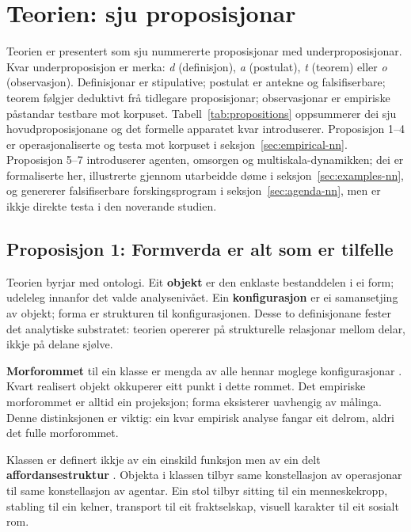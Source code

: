 \section{Teorien: sju proposisjonar}
\label{sec:theory-nn}

Teorien er presentert som sju nummererte proposisjonar med underproposisjonar. Kvar underproposisjon er merka: \textit{d} (definisjon), \textit{a} (postulat), \textit{t} (teorem) eller \textit{o} (observasjon). Definisjonar er stipulative; postulat er antekne og falsifiserbare; teorem følgjer deduktivt frå tidlegare proposisjonar; observasjonar er empiriske påstandar testbare mot korpuset. Tabell~\ref{tab:propositions} oppsummerer dei sju hovudproposisjonane og det formelle apparatet kvar introduserer. Proposisjon 1--4 er operasjonaliserte og testa mot korpuset i seksjon~\ref{sec:empirical-nn}. Proposisjon 5--7 introduserer agenten, omsorgen og multiskala-dynamikken; dei er formaliserte her, illustrerte gjennom utarbeidde døme i seksjon~\ref{sec:examples-nn}, og genererer falsifiserbare forskingsprogram i seksjon~\ref{sec:agenda-nn}, men er ikkje direkte testa i den noverande studien.

\subsection{Proposisjon 1: Formverda er alt som er tilfelle}

Teorien byrjar med ontologi. Eit \textbf{objekt} er den enklaste bestanddelen i ei form; udeleleg innanfor det valde analysenivået. Ein \textbf{konfigurasjon} er ei samansetjing av objekt; forma er strukturen til konfigurasjonen. Desse to definisjonane fester det analytiske substratet: teorien opererer på strukturelle relasjonar mellom delar, ikkje på delane sjølve.

\textbf{Morforommet} til ein klasse er mengda av alle hennar moglege konfigurasjonar \parencite{Raup1966, Mitteroecker2009}. Kvart realisert objekt okkuperer eitt punkt i dette rommet. Det empiriske morforommet er alltid ein projeksjon; forma eksisterer uavhengig av målinga. Denne distinksjonen er viktig: ein kvar empirisk analyse fangar eit delrom, aldri det fulle morforommet.

Klassen er definert ikkje av ein einskild funksjon men av ein delt \textbf{affordansestruktur} \parencite{Gibson1979}. Objekta i klassen tilbyr same konstellasjon av operasjonar til same konstellasjon av agentar. Ein stol tilbyr sitting til ein menneskekropp, stabling til ein kelner, transport til eit fraktselskap, visuell karakter til eit sosialt rom.

